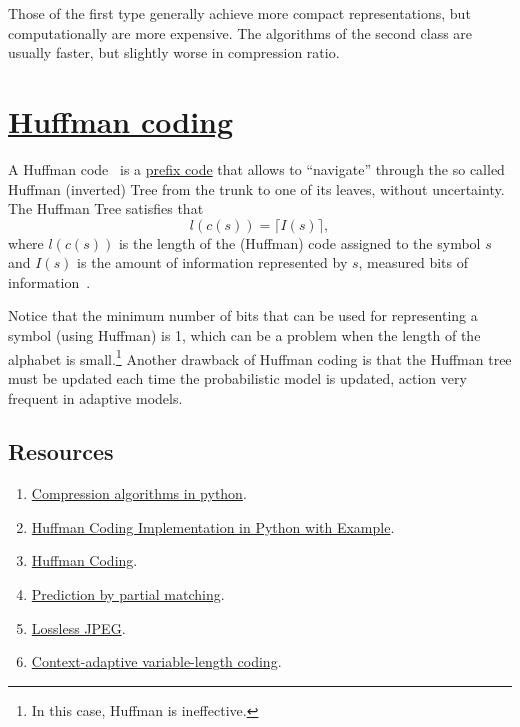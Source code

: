 Those of the first type generally achieve more compact
representations, but computationally are more expensive. The
algorithms of the second class are usually faster, but slightly worse
in compression ratio.

\section{\href{https://en.wikipedia.org/wiki/Huffman_coding}{Huffman coding}}

A Huffman code~\cite{vruiz__huffman_coding,ruiz2000compresion} is a
\href{https://en.wikipedia.org/wiki/Prefix_code}{prefix code} that
allows to ``navigate'' through the so called Huffman (inverted) Tree
from the trunk to one of its leaves, without
uncertainty. The Huffman Tree satisfies that
\begin{equation}
  l(c(s)) = \lceil I(s)\rceil,
  \label{eq:huffman_performance}
\end{equation}
where $l(c(s))$ is the length of the (Huffman) code assigned to the
symbol $s$ and $I(s)$ is the amount of information represented by $s$,
measured bits of information~\cite{vruiz__information_theory}.

Notice that the minimum number of bits that can be used for
representing a symbol (using Huffman) is 1, which can be a problem
when the length of the alphabet is small.\footnote{In this case,
Huffman is ineffective.} Another drawback of Huffman coding is that
the Huffman tree must be updated each time the probabilistic model is
updated, action very frequent in adaptive models.

\subsection*{Resources}
\begin{enumerate}
\item \href{https://www.inference.org.uk/mackay/python/compress/#Huff}{Compression algorithms in python}.
\item \href{https://favtutor.com/blogs/huffman-coding}{Huffman Coding Implementation in Python with Example}.
\item \href{https://www.programiz.com/dsa/huffman-coding}{Huffman Coding}.
\item \href{https://en.wikipedia.org/wiki/Prediction_by_partial_matching}{Prediction by partial matching}.
\item \href{https://en.wikipedia.org/wiki/Lossless_JPEG}{Lossless JPEG}.
\item \href{https://en.wikipedia.org/wiki/Context-adaptive_variable-length_coding}{Context-adaptive variable-length coding}.
\end{enumerate}

